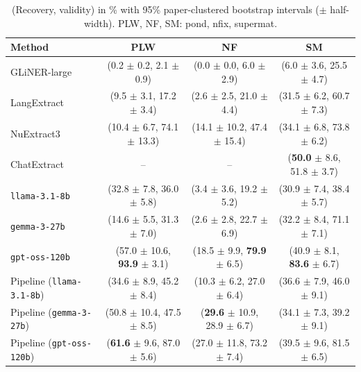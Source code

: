 \begin{table}[t]
\centering
\caption{(Recovery, validity) in \% with 95\% paper-clustered bootstrap intervals ($\pm$ half-width). PLW, NF, SM: pond, nfix, supermat.}
\label{tab:recovery-validity}
\begin{tabular}{lccc}
\toprule
Method & PLW & NF & SM \\
\midrule
GLiNER-large & (0.2 $\pm$ 0.2, 2.1 $\pm$ 0.9) & (0.0 $\pm$ 0.0, 6.0 $\pm$ 2.9) & (6.0 $\pm$ 3.6, 25.5 $\pm$ 4.7) \\
LangExtract & (9.5 $\pm$ 3.1, 17.2 $\pm$ 3.4) & (2.6 $\pm$ 2.5, 21.0 $\pm$ 4.4) & (31.5 $\pm$ 6.2, 60.7 $\pm$ 7.3) \\
NuExtract3 & (10.4 $\pm$ 6.7, 74.1 $\pm$ 13.3) & (14.1 $\pm$ 10.2, 47.4 $\pm$ 15.4) & (34.1 $\pm$ 6.8, 73.8 $\pm$ 6.2) \\
ChatExtract & -- & -- & (\textbf{50.0} $\pm$ 8.6, 51.8 $\pm$ 3.7) \\
\texttt{llama-3.1-8b} & (32.8 $\pm$ 7.8, 36.0 $\pm$ 5.8) & (3.4 $\pm$ 3.6, 19.2 $\pm$ 5.2) & (30.9 $\pm$ 7.4, 38.4 $\pm$ 5.7) \\
\texttt{gemma-3-27b} & (14.6 $\pm$ 5.5, 31.3 $\pm$ 7.0) & (2.6 $\pm$ 2.8, 22.7 $\pm$ 6.9) & (32.2 $\pm$ 8.4, 71.1 $\pm$ 7.1) \\
\texttt{gpt-oss-120b} & (57.0 $\pm$ 10.6, \textbf{93.9} $\pm$ 3.1) & (18.5 $\pm$ 9.9, \textbf{79.9} $\pm$ 6.5) & (40.9 $\pm$ 8.1, \textbf{83.6} $\pm$ 6.7) \\
\midrule
Pipeline (\texttt{llama-3.1-8b}) & (34.6 $\pm$ 8.9, 45.2 $\pm$ 8.4) & (10.3 $\pm$ 6.2, 27.0 $\pm$ 6.4) & (36.6 $\pm$ 7.9, 46.0 $\pm$ 9.1) \\
Pipeline (\texttt{gemma-3-27b}) & (50.8 $\pm$ 10.4, 47.5 $\pm$ 8.5) & (\textbf{29.6} $\pm$ 10.9, 28.9 $\pm$ 6.7) & (34.1 $\pm$ 7.3, 39.2 $\pm$ 9.1) \\
Pipeline (\texttt{gpt-oss-120b}) & (\textbf{61.6} $\pm$ 9.6, 87.0 $\pm$ 5.6) & (27.0 $\pm$ 11.8, 73.2 $\pm$ 7.4) & (39.5 $\pm$ 9.6, 81.5 $\pm$ 6.5) \\
\bottomrule
\end{tabular}
\end{table}
